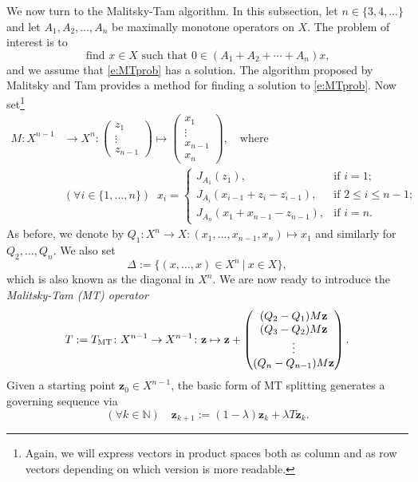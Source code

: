 \documentclass[11pt]{article}
\newcommand{\bz}{\ensuremath{\mathbf{z}}}
\newcommand{\kkk}{\ensuremath{{k\in{\mathbb N}}}}
\newcommand{\menge}[2]{\big\{{#1}~\big |~{#2}\big\}}
\newcommand{\tmt}{\ensuremath{T_{\text{\scriptsize MT}}}}
\theoremstyle{definition}
\begin{document}
{We now turn to the Malitsky-Tam algorithm. 
In this subsection, let $n\in\{3,4,\ldots\}$ and 
let $A_1,A_2,\ldots,A_n$ 
be maximally monotone operators on  $X$. 
The problem of interest is to 
\begin{equation}
\label{e:MTprob}
\text{find $x\in X$ such that $0\in (A_1+A_2+\cdots + A_n)x$,}
\end{equation}
and we assume that \cref{e:MTprob} has a solution. 
The algorithm proposed by Malitsky and Tam \cite{MT} provides a method
for finding a solution to \cref{e:MTprob}.
Now set\footnote{Again, we will express vectors in
product spaces both as column and as row vectors depending 
on which version is more readable.}
\begin{subequations}
\label{e:MTM}
\begin{align}
M\colon X^{n-1}
&\to 
X^n\colon
\begin{pmatrix}
z_1\\
\vdots\\
z_{n-1}
\end{pmatrix}
\mapsto
\begin{pmatrix}
x_1\\
\vdots\\
x_{n-1}\\
x_n
\end{pmatrix},
\quad\text{where}\;\;
\\[+2mm]
&(\forall i\in\{1,\ldots,n\})
\;\;
x_i = \begin{cases}
J_{A_1}(z_1), &\text{if $i=1$;}\\
J_{A_i}(x_{i-1}+z_i-z_{i-1}), &\text{if $2\leq i\leq n-1$;}\\
J_{A_n}(x_1+x_{n-1}-z_{n -1}), &\text{if $i=n$.}
\end{cases}
\end{align}
\end{subequations}
As before, we denote by $Q_1\colon X^n \to X\colon 
(x_1,\ldots,x_{n-1},x_n)\mapsto x_1$
and similarly for $Q_2,\ldots,Q_n$. 
We also set 
\begin{equation}\label{e:delta}
\Delta := \menge{(x,\ldots,x)\in X^n}{x\in X},
\end{equation} 
which is also known as the diagonal in $X^n$. 
We are now ready to introduce the \emph{Malitsky-Tam (MT) operator}
\begin{equation}
\label{e:TMT}
T := \tmt \colon X^{n-1}\to X^{n-1}\colon 
\bz\mapsto 
\bz+ 
\begin{pmatrix}
(Q_2-Q_1)M\bz\\
(Q_3-Q_2)M\bz\\
\vdots\\
(Q_n-Q_{n-1})M\bz
\end{pmatrix}. 
\end{equation}
Given a starting point $\bz_0 \in X^{n-1}$, 
the basic form of 
MT splitting generates a
governing sequence via
\begin{equation}
\label{e:basicMT}
(\forall \kkk)\quad \bz_{k+1} := 
(1-\lambda)\bz_{k} + \lambda T\bz_k. 
\end{equation}

}
\end{document}
